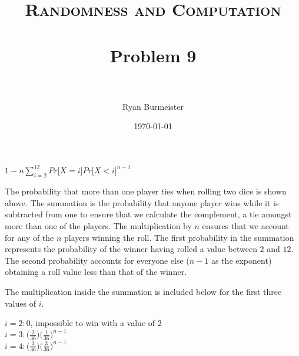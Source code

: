 \documentclass[fontsize=12pt]{article}
\title{ 
  \normalfont \normalsize 
  \textsc{Randomness and Computation} \\ [25pt] %
  \horrule{0.5pt} \\[0.4cm] %
  \huge Problem 9 \\ %
  \horrule{2pt} \\[0.5cm] %
}
\author{Ryan Burmeister} %
\date{\normalsize\today} %
\numberwithin{equation}{section} %
\numberwithin{figure}{section} %
\numberwithin{table}{section} %
\begin{document}
\maketitle %
\begin{center}
$1-n\sum_{i=2}^{12}Pr \big[ X=i \big] Pr \big[ X < i \big]^{n-1}$
\end{center}
The probability that more than one player ties when rolling two dice is shown
above.  The summation is the probability that anyone player wins while it is
subtracted from one to ensure that we calculate the complement, a tie amongst
more than one of the players.  The multiplication by $n$ ensures that we
account for any of the $n$ players winning the roll.  The first probability in
the summation represents the probability of the winner having rolled a value
between $2$ and $12$.  The second probability accounts for everyone else ($n-1$
as the exponent) obtaining a roll value less than that of the winner.

The multiplication inside the summation is included below for the first three
values of $i$.

\begin{center}
$i=2: 0$, impossible to win with a value of $2$ \\
$i=3: \big(\frac{2}{36}\big)\big(\frac{1}{36}\big)^{n-1}$ \\
$i=4: \big(\frac{3}{36}\big)\big(\frac{3}{36}\big)^{n-1}$
\end{center}
\end{document}
